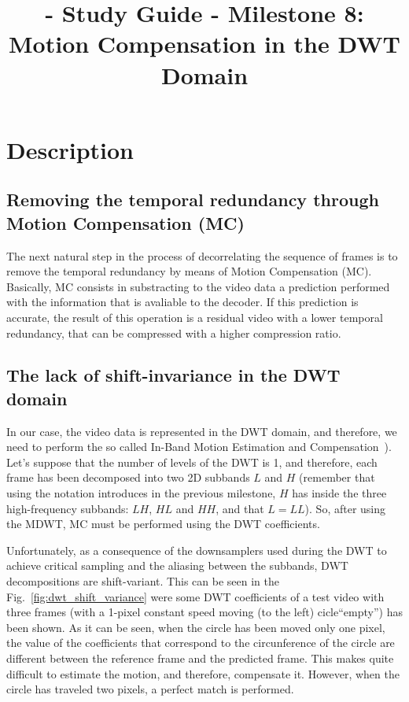 
\title{\SM{} - Study Guide - Milestone 8: Motion Compensation in the DWT Domain}

\maketitle

\section{Description}

\subsection{Removing the temporal redundancy through Motion Compensation (MC)}
The next natural step in the process of decorrelating the sequence of
frames is to remove the temporal redundancy by means of Motion
Compensation (MC). Basically, MC consists in substracting to the video
data a prediction performed with the information that is avaliable to
the decoder. If this prediction is accurate, the result of this
operation is a residual video with a lower temporal redundancy, that
can be compressed with a higher compression ratio.

\subsection{The lack of shift-invariance in the DWT domain}
In our case, the video data is represented in the DWT domain, and
therefore, we need to perform the so called In-Band Motion Estimation
and Compensation~\cite{andreopoulos2005complete}). Let's suppose that
the number of levels of the DWT is 1, and therefore, each frame has
been decomposed into two 2D subbands $L$ and $H$ (remember that using
the notation introduces in the previous milestone, $H$ has inside the
three high-frequency subbands: $LH$, $HL$ and $HH$, and that
$L=LL$). So, after using the MDWT, MC must be performed using the DWT
coefficients.

Unfortunately, as a consequence of the downsamplers used during the
DWT to achieve critical sampling and the aliasing between the
subbands, DWT decompositions are shift-variant. This can be seen in
the Fig.~\ref{fig:dwt_shift_variance} were some DWT coefficients of a
test video with three frames (with a 1-pixel constant speed moving (to
the left) cicle``empty'') has been shown. As it can be seen, when the
circle has been moved only one pixel, the value of the coefficients
that correspond to the circunference of the circle are different
between the reference frame and the predicted frame. This makes quite
difficult to estimate the motion, and therefore, compensate
it. However, when the circle has traveled two pixels, a perfect match
is performed.

